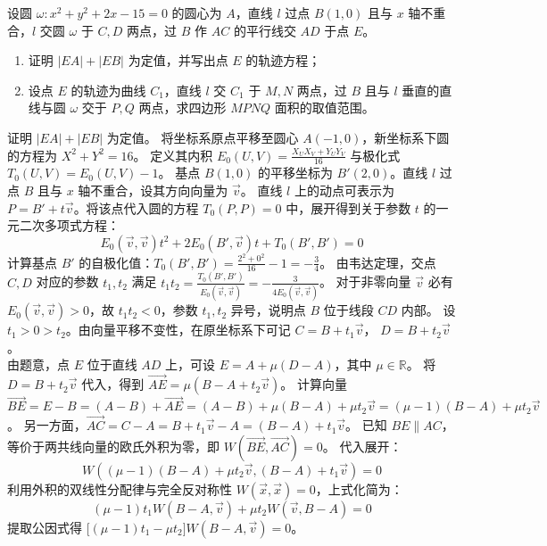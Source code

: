 \begin{example}
设圆 \(\omega: x^2 + y^2 + 2x - 15 = 0\) 的圆心为 \(A\)，直线 \(l\) 过点 \(B(1,0)\) 且与 \(x\) 轴不重合，\(l\) 交圆 \(\omega\) 于 \(C,D\) 两点，过 \(B\) 作 \(AC\) 的平行线交 \(AD\) 于点 \(E\)。
\begin{enumerate}
    \item[(1)] 证明 \(|EA| + |EB|\) 为定值，并写出点 \(E\) 的轨迹方程；
    \item[(2)] 设点 \(E\) 的轨迹为曲线 \(C_1\)，直线 \(l\) 交 \(C_1\) 于 \(M,N\) 两点，过 \(B\) 且与 \(l\) 垂直的直线与圆 \(\omega\) 交于 \(P,Q\) 两点，求四边形 \(MPNQ\) 面积的取值范围。
\end{enumerate}
\end{example}
\begin{solution}
证明 $|EA| + |EB|$ 为定值。
将坐标系原点平移至圆心 $A(-1,0)$，新坐标系下圆的方程为 $X^2 + Y^2 = 16$。
定义其内积 $E_0(U, V) = \frac{X_U X_V + Y_U Y_V}{16}$ 与极化式 $T_0(U, V) = E_0(U, V) - 1$。
基点 $B(1,0)$ 的平移坐标为 $B'(2,0)$。直线 $l$ 过点 $B$ 且与 $x$ 轴不重合，设其方向向量为 $\vec{v}$。
直线 $l$ 上的动点可表示为 $P = B' + t\vec{v}$。将该点代入圆的方程 $T_0(P, P) = 0$ 中，展开得到关于参数 $t$ 的一元二次多项式方程：
$$ E_0(\vec{v}, \vec{v}) t^2 + 2E_0(B', \vec{v}) t + T_0(B', B') = 0 $$
计算基点 $B'$ 的自极化值：$T_0(B', B') = \frac{2^2 + 0^2}{16} - 1 = -\frac{3}{4}$。
由韦达定理，交点 $C, D$ 对应的参数 $t_1, t_2$ 满足 $t_1 t_2 = \frac{T_0(B', B')}{E_0(\vec{v}, \vec{v})} = -\frac{3}{4 E_0(\vec{v}, \vec{v})}$。
对于非零向量 $\vec{v}$ 必有 $E_0(\vec{v}, \vec{v}) > 0$，故 $t_1 t_2 < 0$，参数 $t_1, t_2$ 异号，说明点 $B$ 位于线段 $CD$ 内部。
设 $t_1 > 0 > t_2$。由向量平移不变性，在原坐标系下可记 $C = B + t_1\vec{v}$， $D = B + t_2\vec{v}$。\\
由题意，点 $E$ 位于直线 $AD$ 上，可设 $E = A + \mu(D - A)$，其中 $\mu \in \mathbb{R}$。
将 $D = B + t_2\vec{v}$ 代入，得到 $\overrightarrow{AE} = \mu(B - A + t_2\vec{v})$。
计算向量 $\overrightarrow{BE} = E - B = (A - B) + \overrightarrow{AE} = (A - B) + \mu(B - A) + \mu t_2\vec{v} = (\mu - 1)(B - A) + \mu t_2\vec{v}$。
另一方面，$\overrightarrow{AC} = C - A = B + t_1\vec{v} - A = (B - A) + t_1\vec{v}$。
已知 $BE \parallel AC$，等价于两共线向量的欧氏外积为零，即 $W(\overrightarrow{BE}, \overrightarrow{AC}) = 0$。
代入展开：
$$ W\left( (\mu - 1)(B - A) + \mu t_2\vec{v}, (B - A) + t_1\vec{v} \right) = 0 $$
利用外积的双线性分配律与完全反对称性 $W(\vec{x}, \vec{x}) = 0$，上式化简为：
$$ (\mu - 1)t_1 W(B - A, \vec{v}) + \mu t_2 W(\vec{v}, B - A) = 0 $$
提取公因式得 $\big[ (\mu - 1)t_1 - \mu t_2 \big] W(B - A, \vec{v}) = 0$。

\end{solution}
